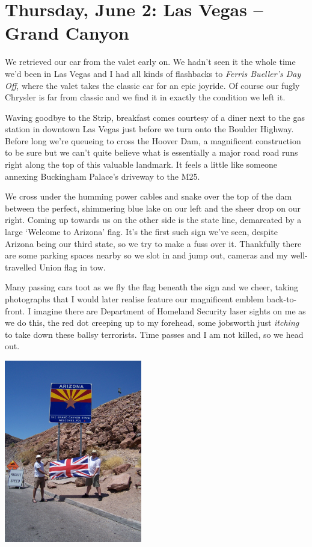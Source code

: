 \documentclass[a5paper,titlepage,11pt,draft]{book}
\begin{document}
\chapter[Las Vegas -- Grand Canyon]{Thursday, June 2: Las Vegas -- Grand Canyon}
We retrieved our car from the valet early on.  We hadn't seen it the whole time we'd been in Las Vegas and I had all kinds of flashbacks to \emph{Ferris Bueller's Day Off}, where the valet takes the classic car for an epic joyride.  Of course our fugly Chrysler is far from classic and we find it in exactly the condition we left it.

Waving goodbye to the Strip, breakfast comes courtesy of a diner next to the gas station in downtown Las Vegas just before we turn onto the Boulder Highway.  Before long we're queueing to cross the Hoover Dam, a magnificent construction to be sure but we can't quite believe what is essentially a major road road runs right along the top of this valuable landmark.  It feels a little like someone annexing Buckingham Palace's driveway to the M25.

We cross under the humming power cables and snake over the top of the dam between the perfect, shimmering blue lake on our left and the sheer drop on our right.  Coming up towards us on the other side is the state line, demarcated by a large `Welcome to Arizona' flag.  It's the first such sign we've seen, despite Arizona being our third state, so we try to make a fuss over it.  Thankfully there are some parking spaces nearby so we slot in and jump out, cameras and my well-travelled Union flag in tow.

Many passing cars toot as we fly the flag beneath the sign and we cheer, taking photographs that I would later realise feature our magnificent emblem back-to-front.  I imagine there are Department of Homeland Security laser sights on me as we do this, the red dot creeping up to my forehead, some jobsworth just \emph{itching} to take down these ballsy terrorists.  Time passes and I am not killed, so we head out.

\begin{center}\includegraphics[height=80mm]{gfx/100_1445}\end{center}
\end{document}
